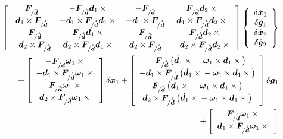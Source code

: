 \documentclass[10pt,dvips,fleqn,subeqn]{report}
\newcommand{\T}[1]{\bm{#1}}
\begin{document}
\begin{align}
	\sqbr{\matr{cccc}{
		\T{F}_{/\dot{\tilde{\T{d}}}} & -\T{F}_{/\dot{\tilde{\T{d}}}} \T{d}_1\times{} &
			- \T{F}_{/\dot{\tilde{\T{d}}}} & \T{F}_{/\dot{\tilde{\T{d}}}} \T{d}_2\times{} \\
		\T{d}_1 \times \T{F}_{/\dot{\tilde{\T{d}}}} &
			- \T{d}_1 \times \T{F}_{/\dot{\tilde{\T{d}}}} \T{d}_1\times{} &
			- \T{d}_1 \times \T{F}_{/\dot{\tilde{\T{d}}}} &
			\T{d}_1 \times \T{F}_{/\dot{\tilde{\T{d}}}} \T{d}_2\times{} \\
		- \T{F}_{/\dot{\tilde{\T{d}}}} & \T{F}_{/\dot{\tilde{\T{d}}}} \T{d}_1\times{} &
			\T{F}_{/\dot{\tilde{\T{d}}}} & - \T{F}_{/\dot{\tilde{\T{d}}}} \T{d}_2\times{} \\
		- \T{d}_2 \times \T{F}_{/\dot{\tilde{\T{d}}}} &
			\T{d}_2 \times \T{F}_{/\dot{\tilde{\T{d}}}} \T{d}_1\times{} &
			\T{d}_2 \times \T{F}_{/\dot{\tilde{\T{d}}}} &
			- \T{d}_2 \times \T{F}_{/\dot{\tilde{\T{d}}}} \T{d}_2\times{}
	}} \cubr{\cvvect{
		\delta\dot{\T{x}}_1 \\
		\delta\dot{\T{g}}_1 \\
		\delta\dot{\T{x}}_2 \\
		\delta\dot{\T{g}}_2
	}}
	& \nonumber \\
%
%
%
	\mbox{}
	+ \sqbr{\cvvect{
		- \T{F}_{/\dot{\tilde{\T{d}}}} \T{\omega}_1 \times{} \\
		- \T{d}_1 \times \T{F}_{/\dot{\tilde{\T{d}}}} \T{\omega}_1 \times{} \\
		\T{F}_{/\dot{\tilde{\T{d}}}} \T{\omega}_1 \times{} \\
		\T{d}_2 \times \T{F}_{/\dot{\tilde{\T{d}}}} \T{\omega}_1 \times{}
	}} \delta\T{x}_1 
%
	+ \sqbr{\cvvect{
		- \T{F}_{/\dot{\tilde{\T{d}}}} \plbr{
			\dot{\T{d}}_1 \times{} - \T{\omega}_1 \times \T{d}_1\times{}
		} \\
		- \T{d}_1 \times \T{F}_{/\dot{\tilde{\T{d}}}} \plbr{
			\dot{\T{d}}_1 \times{} - \T{\omega}_1 \times \T{d}_1\times{}
		} \\
		\T{F}_{/\dot{\tilde{\T{d}}}} \plbr{
			\dot{\T{d}}_1 \times{} - \T{\omega}_1 \times \T{d}_1\times{}
		} \\
		\T{d}_2 \times \T{F}_{/\dot{\tilde{\T{d}}}} \plbr{
			\dot{\T{d}}_1 \times{} - \T{\omega}_1 \times \T{d}_1\times{}
		}
	}} \delta\T{g}_1
	& \nonumber \\
%
	\mbox{}
	+ \sqbr{\cvvect{
		\T{F}_{/\dot{\tilde{\T{d}}}} \T{\omega}_1 \times{} \\
		\T{d}_1 \times \T{F}_{/\dot{\tilde{\T{d}}}} \T{\omega}_1 \times{} \\
}}
\end{align}
\end{document}
